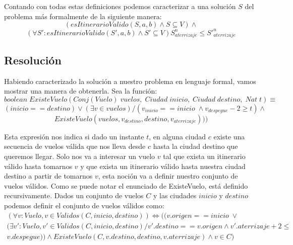 Contando con todas estas definiciones podemos caracterizar a una solución $S$ del problema más formalmente de la siguiente
manera:
\begin{displaymath}
  (esItinerarioValido(S, a, b) \land S \subseteq V) \land 
\end{displaymath}
\begin{displaymath}
  (\forall S' : esItinerarioValido(S', a, b) \land S' \subseteq V) S^n_{aterrizaje} \leq S'^n_{aterrizaje}
\end{displaymath}

\subsection{Resolución}
Habiendo caracterizado la soluci\'on a nuestro problema en lenguaje formal, vamos mostrar una manera de obtenerla.
\newpage
Sea la funci\'on:
\begin{displaymath}
boolean\;ExisteVuelo(Conj(Vuelo) \; vuelos,\; Ciudad\;inicio,\;Ciudad\;destino,\;Nat \;t) \equiv
\end{displaymath}
\begin{displaymath}
(inicio == destino) \vee (\exists v \in vuelos) / (v_{inicio} == inicio \; \wedge
v_{despegue} - 2 \geq t) \wedge 
\end{displaymath}
\begin{displaymath}
ExisteVuelo(vuelos, v_{destino}, destino, v_{aterrizaje})))  
\end{displaymath}

Esta expresi\'on nos indica si dado un instante $t$, en alguna ciudad $c$ existe una secuencia de vuelos 
v\'alida que nos lleva desde $c$ hasta la ciudad destino que queremos llegar.
Solo nos va a interesar un vuelo $v$ tal que exista un itinerario v\'alido hasta tomarnos $v$ y que exista un 
itinerario v\'alido hasta nuestra ciudad destino a partir de tomarnos $v$, esta noci\'on va a definir nuestro 
conjunto de vuelos v\'alidos. Como se puede notar el enunciado de ExisteVuelo, está definido recursivamente.
Dados un conjunto de vuelos $C$ y las ciudades $inicio$ y $destino$ podemos definir el conjunto de vuelos v\'alidos como:
\begin{align*}
(\forall v:Vuelo, v \in Validos(C,inicio,destino)) \Leftrightarrow ((v.origen == inicio \;\vee \\
(\exists v':Vuelo, v' \in Validos(C,inicio,destino) / v'.destino == v.origen \wedge v'.aterrizaje + 2 \leq\\ v.despegue)) \wedge ExisteVuelo(C,v.destino,destino,v.aterrizaje) \wedge v \in C)
\end{align*}

